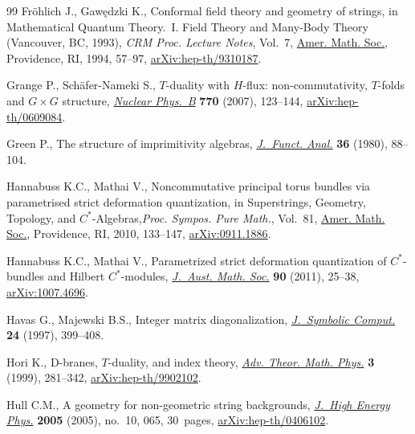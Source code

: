 \documentclass[10pt,a4paper]{amsart}
\numberwithin{equation}{section}
\begin{document}
\begin{thebibliography}{99}
Fr\"ohlich J., Gaw\k{e}dzki K., Conformal field theory and geometry of strings,
 in Mathematical Quantum Theory.~{I}. {F}ield Theory and Many-Body Theory
 ({V}ancouver, {BC}, 1993), \textit{CRM Proc. Lecture Notes}, Vol.~7, \href{https://doi.org/10.1090/crmp/007/03}{Amer.
 Math. Soc.}, Providence, RI, 1994, 57--97, \href{https://arxiv.org/abs/hep-th/9310187}{arXiv:hep-th/9310187}.

Grange P., Sch\"afer-Nameki S., {$T$}-duality with {$H$}-flux:
 non-commutativity, {$T$}-folds and {$G\times G$} structure, \href{https://doi.org/10.1016/j.nuclphysb.2007.02.003}{\textit{Nuclear
 Phys.~B}} \textbf{770} (2007), 123--144, \href{https://arxiv.org/abs/hep-th/0609084}{arXiv:hep-th/0609084}.

Green P., The structure of imprimitivity algebras, \href{https://doi.org/10.1016/0022-1236(80)90108-1}{\textit{J.~Funct. Anal.}}
 \textbf{36} (1980), 88--104.

Hannabuss K.C., Mathai V., Noncommutative principal torus bundles via
 parametrised strict deformation quantization, in Superstrings, Geometry,
 Topology, and {$C^\ast$}-Algebras,\textit{Proc. Sympos. Pure Math.},
 Vol.~81, \href{https://doi.org/10.1090/pspum/081/2681761}{Amer. Math. Soc.}, Providence, RI, 2010, 133--147,
 \href{https://arxiv.org/abs/0911.1886}{arXiv:0911.1886}.

Hannabuss K.C., Mathai V., Parametrized strict deformation quantization of
 {$C^\ast$}-bundles and {H}ilbert {$C^\ast$}-modules, \href{https://doi.org/10.1017/S1446788711001170}{\textit{J.~Aust. Math.
 Soc.}} \textbf{90} (2011), 25--38, \href{https://arxiv.org/abs/#2}{arXiv:1007.4696}.

Havas G., Majewski B.S., Integer matrix diagonalization, \href{https://doi.org/10.1006/jsco.1996.0141}{\textit{J.~Symbolic
 Comput.}} \textbf{24} (1997), 399--408.

Hori K., D-branes, {$T$}-duality, and index theory, \href{https://doi.org/10.4310/ATMP.1999.v3.n2.a5}{\textit{Adv. Theor. Math.
 Phys.}} \textbf{3} (1999), 281--342, \href{https://arxiv.org/abs/hep-th/9902102}{arXiv:hep-th/9902102}.

Hull C.M., A geometry for non-geometric string backgrounds, \href{https://doi.org/10.1088/1126-6708/2005/10/065}{\textit{J.~High
 Energy Phys.}} \textbf{2005} (2005), no.~10, 065, 30~pages,
 \href{https://arxiv.org/abs/hep-th/0406102}{arXiv:hep-th/0406102}.


\end{thebibliography}
\end{document}
